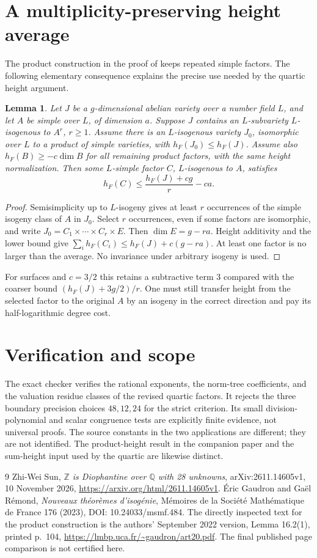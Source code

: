 \documentclass[11pt,a4paper]{article}
\newtheorem{lemma}[theorem]{Lemma}
\newcommand{\Q}{\mathbb Q}\newcommand{\Z}{\mathbb Z}
\begin{document}
\section{A multiplicity-preserving height average}
The product construction in the proof of \cite[Lemma 16.2(1)]{GR}
keeps repeated simple factors. The following elementary consequence
explains the precise use needed by the quartic height argument.
\begin{lemma}
Let $J$ be a $g$-dimensional abelian variety over a number field $L$,
and let $A$ be simple over $L$, of dimension $a$.
Suppose $J$ contains an $L$-subvariety $L$-isogenous to $A^r$, $r\ge1$.
Assume there is an $L$-isogenous variety $J_0$, isomorphic over $L$ to
a product of simple varieties, with $h_F(J_0)\le h_F(J)$.
Assume also $h_F(B)\ge-c\dim B$ for all remaining product factors,
with the same height normalization. Then some $L$-simple factor
$C$, $L$-isogenous to $A$, satisfies
\[
                h_F(C)\le\frac{h_F(J)+cg}{r}-ca.
\]
\end{lemma}
\begin{proof}
Semisimplicity up to $L$-isogeny gives at least $r$ occurrences of the
simple isogeny class of $A$ in $J_0$. Select $r$ occurrences, even if
some factors are isomorphic, and write $J_0=C_1\times\cdots\times C_r\times E$.
Then $\dim E=g-ra$. Height additivity and the lower bound give
$\sum_i h_F(C_i)\le h_F(J)+c(g-ra)$. At least one factor is no larger
than the average. No invariance under arbitrary isogeny is used.
\end{proof}
For surfaces and $c=3/2$ this retains a subtractive term $3$ compared
with the coarser bound $(h_F(J)+3g/2)/r$. One must still transfer height
from the selected factor to the original $A$ by an isogeny in the
correct direction and pay its half-logarithmic degree cost.

\section{Verification and scope}
The exact checker verifies the rational exponents, the norm-tree
coefficients, and the valuation residue classes of the revised quartic
factors. It rejects the three boundary precision choices $48,12,24$
for the strict criterion. Its small division-polynomial and scalar
congruence tests are explicitly finite evidence, not universal proofs.
The source constants in the two applications are different; they are
not identified. The product-height result in the companion paper
and the sum-height input used by the quartic are likewise distinct.

\begin{thebibliography}{9}
 Zhi-Wei Sun, \emph{$\Z$ is Diophantine over $\Q$ with
28 unknowns}, arXiv:2611.14605v1, 10 November 2026,
\url{https://arxiv.org/html/2611.14605v1}.
 \'Eric Gaudron and Ga\"el R\'emond,
\emph{Nouveaux th\'eor\`emes d'isog\'enie}, M\'emoires de la Soci\'et\'e
Math\'ematique de France 176 (2023), DOI: 10.24033/msmf.484.
The directly inspected text for the product construction is the authors'
September 2022 version, Lemma 16.2(1), printed p.~104,
\url{https://lmbp.uca.fr/~gaudron/art20.pdf}.
The final published page comparison is not certified here.
\end{thebibliography}
\end{document}
